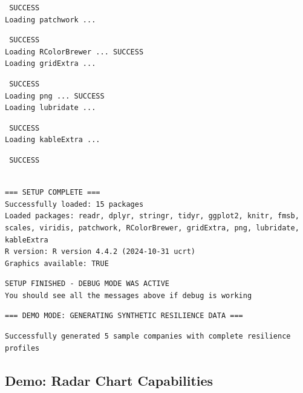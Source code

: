 \documentclass[
  oneside,
  open=any,
  fontsize=11pt]{article}
\begin{document}
\begin{verbatim}
 SUCCESS
Loading patchwork ...
\end{verbatim}

\begin{verbatim}
 SUCCESS
Loading RColorBrewer ... SUCCESS
Loading gridExtra ...
\end{verbatim}

\begin{verbatim}
 SUCCESS
Loading png ... SUCCESS
Loading lubridate ...
\end{verbatim}

\begin{verbatim}
 SUCCESS
Loading kableExtra ...
\end{verbatim}

\begin{verbatim}
 SUCCESS
\end{verbatim}

\begin{verbatim}

=== SETUP COMPLETE ===
Successfully loaded: 15 packages
Loaded packages: readr, dplyr, stringr, tidyr, ggplot2, knitr, fmsb, scales, viridis, patchwork, RColorBrewer, gridExtra, png, lubridate, kableExtra 
R version: R version 4.4.2 (2024-10-31 ucrt) 
Graphics available: TRUE 
\end{verbatim}

\begin{verbatim}
SETUP FINISHED - DEBUG MODE WAS ACTIVE
You should see all the messages above if debug is working
\end{verbatim}

\begin{verbatim}
=== DEMO MODE: GENERATING SYNTHETIC RESILIENCE DATA ===
\end{verbatim}

\begin{verbatim}
Successfully generated 5 sample companies with complete resilience profiles
\end{verbatim}

\subsection{Demo: Radar Chart
Capabilities}\label{demo-radar-chart-capabilities}
\end{document}
